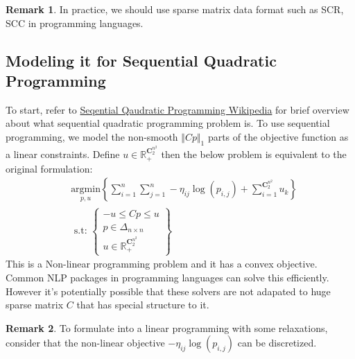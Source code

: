 \documentclass[11pt]{article}
\theoremstyle{definition}
\newtheorem{remark}{Remark}[subsection]
{
    \newtheorem{assumption}{Assumption}
}
\numberwithin{equation}{subsection}
\begin{document}
        \begin{remark}
            In practice, we should use sparse matrix data format such as SCR, SCC in programming languages. 
        \end{remark}
    \subsection{Modeling it for Sequential Quadratic Programming}\label{sec:sqp_formulation}
        To start, refer to \href{https://en.wikipedia.org/wiki/Sequential_quadratic_programming}{Seqential Qaudratic Programming Wikipedia} for brief overview about what sequential quadratic programming problem is. 
        To use sequential programming, we model the non-smooth $\Vert Cp\Vert_1$ parts of the objective function as a linear constraints. 
        Define $u\in \mathbb R^{\mathbf C^{n^2}_2}_+$ then the below problem is equivalent to the original formulation:
        \begin{align}
            &\underset{
                \substack{
                        p, u
                    }
            }{\text{argmin}} 
            \left\lbrace
                \sum_{i = 1}^{n}\sum_{j = 1}^{n}
                    -\eta_{ij}\log(p_{i, j})
                + 
                \sum_{i = 1}^{\mathbf C_2^{n^2}} u_k
            \right\rbrace
            \\
            &\text{ s.t: }
            \left\lbrace
            \begin{aligned}
                - u \le Cp \le u
                \\
                p \in \Delta_{n\times n}
                \\ 
                u \in \mathbb R^{\mathbf C^{n^2}_2}_+
            \end{aligned}
            \right\rbrace
        \end{align}
        This is a Non-linear programming problem and it has a convex objective. 
        Common NLP packages in programming languages can solve this efficiently. 
        However it's potentially possible that these solvers are not adapated to huge sparse matrix $C$ that has special structure to it. 
        \begin{remark}
            To formulate into a linear programming with some relaxations, consider that the non-linear objective $-\eta_{ij}\log(p_{i,j})$ can be discretized. 
        \end{remark}
\end{document}
